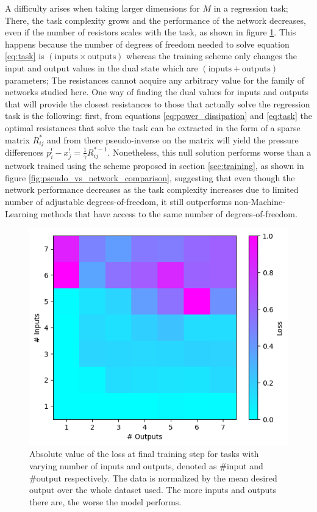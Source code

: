 \documentclass[%
 reprint,
 amsmath,amssymb,
 aps,
]{revtex4-2}
\begin{document}
    A difficulty arises when taking larger dimensions for $M$ in a regression task; There, the task complexity grows and the performance of the network decreases, even if the number of resistors scales with the task, as shown in figure \ref{fig:log_loss_afo_inputs_outputs}. This happens because the number of degrees of freedom needed to solve equation \ref{eq:task} is $\left(\text{inputs}\times\text{outputs}\right)$ whereas the training scheme only changes the input and output values in the dual state which are $\left(\text{inputs}+\text{outputs}\right)$ parameters; The resistances cannot acquire any arbitrary value for the family of networks studied here. One way of finding the dual values for inputs and outputs that will provide the closest resistances to those that actually solve the regression task is the following: first, from equations \ref{eq:power_dissipation} and \ref{eq:task} the optimal resistances that solve the task can be extracted in the form of a sparse matrix $R_{ij}^*$ and from there pseudo-inverse on the matrix will yield the pressure differences $p_i^!-x_j^!=\frac{1}{\gamma}R_{ij}^{*-1}$. Nonetheless, this null solution performs worse than a network trained using the scheme proposed in section \ref{sec:training}, as shown in figure \ref{fig:pseudo_vs_network_comparison}, suggesting that even though the network performance decreases as the task complexity increases due to limited number of adjustable degrees-of-freedom, it still outperforms non-Machine-Learning methods that have access to the same number of degrees-of-freedom.

    \begin{figure}[ht]
    \centerline{
    \includegraphics[width=\columnwidth]{Figures/matrix_task_complexity_normalized.png}
    }
    \caption{Absolute value of the loss at final training step for tasks with varying number of inputs and outputs, denoted as $\#\text{input}$ and $\#\text{output}$ respectively. The data is normalized by the mean desired output over the whole dataset used. The more inputs and outputs there are, the worse the model performs.}
    \label{fig:log_loss_afo_inputs_outputs}
    \end{figure}
\end{document}
